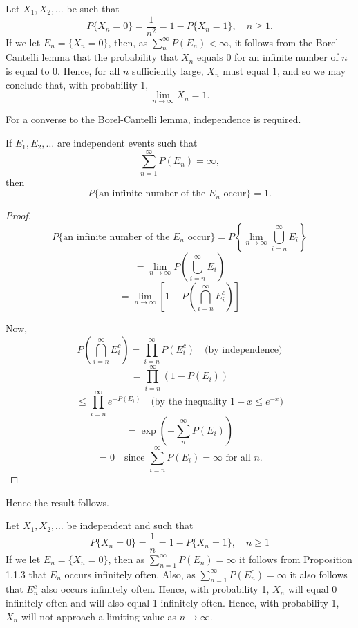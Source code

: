\documentclass[lang=cn,10pt,thmcnt=section]{elegantbook}
\begin{document}
\begin{example}
	Let \(X_1, X_2, \ldots\) be such that
\[
P\{X_n = 0\} = \frac{1}{n^2} = 1 - P\{X_n = 1\}, \quad n \geq 1.
\]
If we let \(E_n = \{X_n = 0\}\), then, as \(\sum_{n}^{\infty} P(E_n) < \infty\), it follows from the Borel-Cantelli lemma that the probability that \(X_n\) equals 0 for an infinite number of \(n\) is equal to 0. Hence, for all \(n\) sufficiently large, \(X_n\) must equal 1, and so we may conclude that, with probability 1,
\[
\lim_{n \to \infty} X_n = 1.
\]
\end{example}
For a converse to the Borel-Cantelli lemma, independence is required.
\begin{proposition}
	If \(E_1, E_2, \ldots\) are independent events such that
\[
\sum_{n=1}^{\infty} P(E_n) = \infty,
\]
then
\[
P\{\text{an infinite number of the } E_n \text{ occur}\} = 1.
\]
\end{proposition}
\begin{proof}
	\[
P\{\text{an infinite number of the } E_n \text{ occur}\} = P\left\{\lim_{n \to \infty} \bigcup_{i=n}^{\infty} E_i\right\}
\]
\[
= \lim_{n \to \infty} P\left(\bigcup_{i=n}^{\infty} E_i\right)
\]
\[
= \lim_{n \to \infty} \left[1 - P\left(\bigcap_{i=n}^{\infty} E_i^c\right)\right]
\]

Now,
\[
P\left(\bigcap_{i=n}^{\infty} E_i^c\right) = \prod_{i=n}^{\infty} P(E_i^c) \quad \text{(by independence)}
\]
\[
= \prod_{i=n}^{\infty} (1 - P(E_i))
\]
\[
\leq \prod_{i=n}^{\infty} e^{-P(E_i)} \quad \text{(by the inequality } 1 - x \leq e^{-x} \text{)}
\]
\[
= \exp\left(-\sum_{n}^{\infty} P(E_i)\right)
\]
\[
= 0 \quad \text{since } \sum_{i=n}^{\infty} P(E_i) = \infty \text{ for all } n.
\]
\end{proof}
Hence the result follows.
\begin{example}
	Let \(X_1, X_2, \ldots\) be independent and such that
\[
P\{X_n = 0\} = \frac{1}{n} = 1 - P\{X_n = 1\}, \quad n \geq 1
\]
If we let \(E_n = \{X_n = 0\}\), then as \(\sum_{n=1}^{\infty} P(E_n) = \infty\) it follows from Proposition 1.1.3 that \(E_n\) occurs infinitely often. Also, as \(\sum_{n=1}^{\infty} P(E_n^c) = \infty\) it also follows that \(E_n^c\) also occurs infinitely often. Hence, with probability 1, \(X_n\) will equal 0 infinitely often and will also equal 1 infinitely often. Hence, with probability 1, \(X_n\) will not approach a limiting value as \(n \to \infty\).
\end{example}
\end{document}
